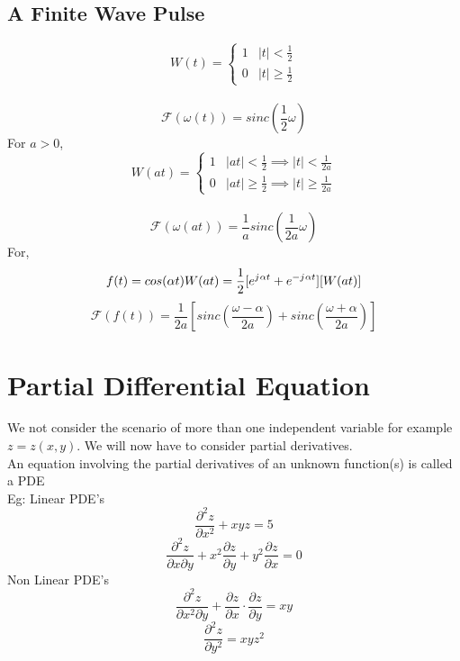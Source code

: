 \documentclass[11pt]{article}
\theoremstyle{definition}
\newcommand{\iu}{{j\mkern1mu}}
\newcommand{\F}{{\mathcal{F}}}
\newcommand{\pd}{{\partial}}
\begin{document}
\subsection{A Finite Wave Pulse}
\[W(t) =  \begin{cases} 
      1 & |t| < \frac{1}{2} \\
      0 & |t| \geq \frac{1}{2}
   \end{cases}
\]\\
$$\F(\omega(t)) = sinc(\frac{1}{2}\omega)$$
\clearpage
For $a > 0$,
\[W(at) =  \begin{cases} 
      1 & |at| < \frac{1}{2} \implies |t| < \frac{1}{2a}\\
      0 & |at| \geq \frac{1}{2} \implies |t| \geq \frac{1}{2a}
   \end{cases}
\]\\
$$\F(\omega(at)) = \frac{1}{a}sinc(\frac{1}{2a}\omega)$$
For, 
$$f(t) = cos(\alpha t) W(at) = \frac{1}{2}[e^{\iu \alpha t} + e^{-\iu \alpha t}][W(at)]$$
$$\F(f(t)) = \frac{1}{2a}[sinc(\frac{\omega - \alpha}{2a}) + sinc(\frac{\omega + \alpha}{2a})]$$
\newpage
\section{Partial Differential Equation}
We not consider the scenario of more than one independent variable for example $z = z(x, y)$. We will now have to consider partial derivatives.\\
An equation involving the partial derivatives of an unknown function(s) is called a PDE\\
Eg:
Linear PDE's
$$\frac{\pd^2z}{\pd x^2} + xyz = 5$$
$$\frac{\pd^2z}{\pd x \pd y} + x^2\frac{\pd z}{\pd y} + y^2 \frac{\pd z}{\pd x} = 0$$
Non Linear PDE's
$$\frac{\pd^2 z}{\pd x^2 \pd y} + \frac{\pd z}{\pd x} \cdot \frac{\pd z}{\pd y} = xy$$
$$\frac{\pd^2 z}{\pd y^2} = xyz^2$$
\end{document}
